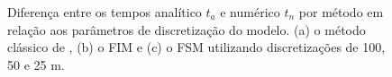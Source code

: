 \begin{figure}[H]
	\centering
	\newline
	\newline
	\newline
		
	\caption{Diferença entre os tempos analítico $t_a$ e numérico $t_n$ por método em relação aos parâmetros de discretização do modelo. (a) o método clássico de , (b) o FIM e (c) o FSM utilizando discretizações de 100, 50 e 25 m.}
	\label{fig:precision_refraction_study}	
\end{figure}

